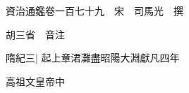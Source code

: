 






























































資治通鑑卷一百七十九　宋　司馬光　撰

胡三省　音注

隋紀三|{
	起上章涒灘盡昭陽大淵獻凡四年}


高祖文皇帝中

